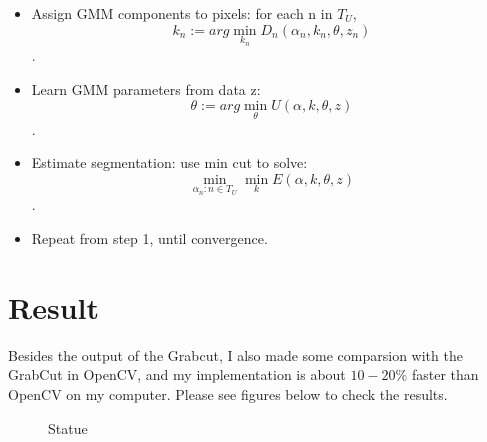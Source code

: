 \documentclass{article}
\begin{document}
            \begin{itemize}
                \item Assign GMM components to pixels: for each n in $T_{U}$,
                        $$k_{n} := arg \min_{k_{n}} D_{n}(\alpha_{n}, k_{n}, \theta, z_{n})$$.
                \item Learn GMM parameters from data z:
                        $$\theta := arg \min_{\theta} U(\alpha, k, \theta, z)$$.
                \item Estimate segmentation: use min cut to solve:
                        $$\min_{\alpha_{n} : n \in T_{U}} \min_{k} E(\alpha, k, \theta, z)$$.
                \item Repeat from step 1, until convergence.
            \end{itemize}

\section{Result}

    Besides the output of the Grabcut, I also made some comparsion with the GrabCut in OpenCV, and my implementation is about $10-20\%$ faster than OpenCV on my computer. Please see figures below to check the results.

    \begin{figure}
        \begin{center}
        \end{center}
        \caption{Statue}
    \end{figure}
\end{document}
